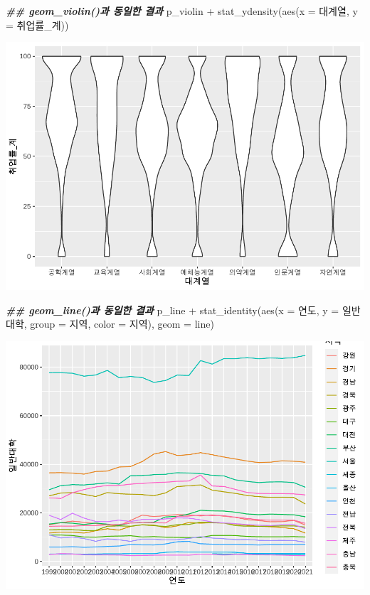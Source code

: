 \documentclass[
]{article}
\newenvironment{Shaded}{\begin{snugshade}}{\end{snugshade}}
\newcommand{\AttributeTok}[1]{\textcolor[rgb]{0.77,0.63,0.00}{#1}}
\newcommand{\DocumentationTok}[1]{\textcolor[rgb]{0.56,0.35,0.01}{\textbf{\textit{#1}}}}
\newcommand{\FunctionTok}[1]{\textcolor[rgb]{0.00,0.00,0.00}{#1}}
\newcommand{\NormalTok}[1]{#1}
\newcommand{\SpecialCharTok}[1]{\textcolor[rgb]{0.00,0.00,0.00}{#1}}
\newcommand{\StringTok}[1]{\textcolor[rgb]{0.31,0.60,0.02}{#1}}
\begin{document}
\begin{Shaded}
\begin{Highlighting}[]
\DocumentationTok{\#\# geom\_violin()과 동일한 결과}
\NormalTok{p\_violin }\SpecialCharTok{+} 
  \FunctionTok{stat\_ydensity}\NormalTok{(}\FunctionTok{aes}\NormalTok{(}\AttributeTok{x =}\NormalTok{ 대계열, }\AttributeTok{y =}\NormalTok{ 취업률\_계)) }
\end{Highlighting}
\end{Shaded}

\includegraphics{chap3_files/figure-latex/unnamed-chunk-51-10.pdf}

\begin{Shaded}
\begin{Highlighting}[]
\DocumentationTok{\#\# geom\_line()과 동일한 결과}
\NormalTok{p\_line }\SpecialCharTok{+} 
  \FunctionTok{stat\_identity}\NormalTok{(}\FunctionTok{aes}\NormalTok{(}\AttributeTok{x =}\NormalTok{ 연도, }\AttributeTok{y =}\NormalTok{ 일반대학, }\AttributeTok{group =}\NormalTok{ 지역, }\AttributeTok{color =}\NormalTok{ 지역), }\AttributeTok{geom =} \StringTok{\textquotesingle{}line\textquotesingle{}}\NormalTok{)}
\end{Highlighting}
\end{Shaded}

\includegraphics{chap3_files/figure-latex/unnamed-chunk-51-11.pdf}
\end{document}

